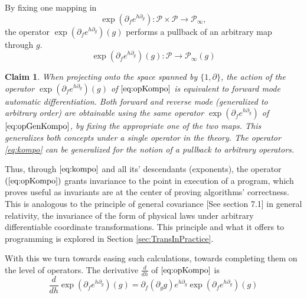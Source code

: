 \documentclass[preprint,12pt]{elsarticle}
\newcommand{\dP}{\mathcal{P}}
\newcommand{\D}{\partial}
\newtheorem{trditev}{Claim}[section]
\begin{document}
 By fixing one mapping in  
 \begin{equation}\label{eq:opGenKompo}
\exp(\D_fe^{h\D_g}): \dP\times\dP\to\dP_\infty,
 \end{equation}
 the operator $\exp(\D_fe^{h\D_g})(g)$ performs a pullback of an arbitrary map through $g$. 
  \begin{equation}\label{eq:opKompo}
  \exp(\D_fe^{h\D_g})(g): \dP\to\dP_\infty(g)
  \end{equation}
 \begin{trditev}\label{trd:reverseForward}
 When projecting onto the space spanned by $\{1,\D\}$, the action of the operator $\exp(\D_fe^{h\D_g})(g)$ of $\eqref{eq:opKompo}$ is equivalent to forward \cite{PcAD} mode automatic differentiation. Both forward \cite{PcAD} and reverse \cite{ReverseAD} mode (generalized to arbitrary order) are obtainable using the same operator $\exp(\D_fe^{h\D_g})$ of $\eqref{eq:opGenKompo}$, by fixing the appropriate one of the two maps. This generalizes both concepts under a single operator in the theory. The operator \eqref{eq:kompo} can be generalized for the notion of a pullback to arbitrary operators.
 \end{trditev}
 
 Thus, through $\eqref{eq:kompo}$ and all its' descendants (exponents), the operator $(\ref{eq:opKompo})$ grants invariance to the point in execution of a program, which proves useful as invariants are at the center of proving algorithms' correctness. This is analogous to the principle of general covariance \cite{GeneralCovariance}[See section 7.1] in general relativity, the invariance of the form of physical laws under arbitrary differentiable coordinate transformations. This principle and what it offers to programming is explored in Section \ref{sec:TransInPractice}.
 
 With this we turn towards easing such calculations, towards completing them on the level of operators. The derivative $\frac{d}{dh}$ of $\eqref{eq:opKompo}$ is
 \begin{equation}\label{eq:dexp}
 \frac{d}{dh}\exp(\D_fe^{h\D_g})(g)=\D_f(\D_gg)e^{h\D_g}\exp(\D_fe^{h\D_g})(g)
 \end{equation}
 
\end{document}
